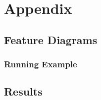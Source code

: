 \appendix
\chapter{Appendix}
\label{appendix}

\section{Feature Diagrams}
\label{feature_diagrams}

\subsection{Running Example}



\section{Results}

